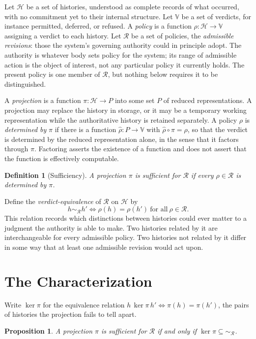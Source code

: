 \documentclass[11pt]{article}
\newtheorem{definition}{Definition}
\newtheorem{proposition}{Proposition}
\theoremstyle{remark}
\newcommand{\Hist}{\mathcal{H}}
\newcommand{\Rev}{\mathcal{R}}
\newcommand{\Vset}{\mathbb{V}}
\renewcommand{\ker}{\operatorname{ker}}
\begin{document}
Let $\Hist$ be a set of histories, understood as complete records of what occurred, with no commitment yet to their internal structure. Let $\Vset$ be a set of verdicts, for instance permitted, deferred, or refused. A \emph{policy} is a function $\rho:\Hist\to\Vset$ assigning a verdict to each history. Let $\Rev$ be a set of policies, the \emph{admissible revisions}: those the system's governing authority could in principle adopt. The authority is whatever body sets policy for the system; its range of admissible action is the object of interest, not any particular policy it currently holds. The present policy is one member of $\Rev$, but nothing below requires it to be distinguished.

A \emph{projection} is a function $\pi:\Hist\to P$ into some set $P$ of reduced representations. A projection may replace the history in storage, or it may be a temporary working representation while the authoritative history is retained separately. A policy $\rho$ is \emph{determined by} $\pi$ if there is a function $\hat\rho:P\to\Vset$ with $\hat\rho\circ\pi=\rho$, so that the verdict is determined by the reduced representation alone, in the sense that it factors through $\pi$. Factoring asserts the existence of a function and does not assert that the function is effectively computable.

\begin{definition}[Sufficiency]\label{def:suff}
A projection $\pi$ is \emph{sufficient for $\Rev$} if every $\rho\in\Rev$ is determined by $\pi$.
\end{definition}

Define the \emph{verdict-equivalence} of $\Rev$ on $\Hist$ by
\[
h\sim_{\Rev}h' \iff \rho(h)=\rho(h')\ \text{for all}\ \rho\in\Rev .
\]
This relation records which distinctions between histories could ever matter to a judgment the authority is able to make. Two histories related by it are interchangeable for every admissible policy. Two histories not related by it differ in some way that at least one admissible revision would act upon.

\section{The Characterization}\label{sec:char}

Write $\ker\pi$ for the equivalence relation $h\,\ker\pi\,h' \iff \pi(h)=\pi(h')$, the pairs of histories the projection fails to tell apart.

\begin{proposition}\label{prop:char}
A projection $\pi$ is sufficient for $\Rev$ if and only if $\ker\pi\subseteq{\sim_{\Rev}}$.
\end{proposition}
\end{document}
